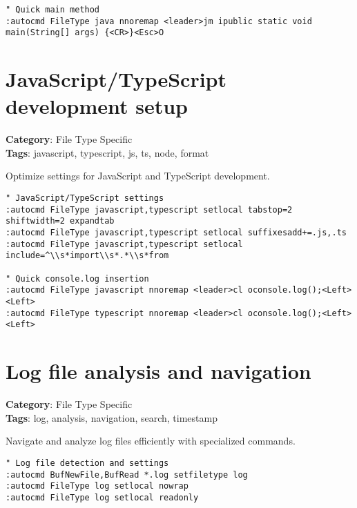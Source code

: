 {{{{{\begin{Exa*}{}
\begin{Verbatim}[fontsize=\footnotesize, breaklines, breakanywhere]
" Quick main method
:autocmd FileType java nnoremap <leader>jm ipublic static void main(String[] args) {<CR>}<Esc>O
\end{Verbatim}
\end{Exa*}

\section{JavaScript/TypeScript development setup}

\textbf{Category}: File Type Specific\\ \textbf{Tags}: javascript, typescript, js, ts, node, format
\vspace{0.5cm}

Optimize settings for JavaScript and TypeScript development.

\begin{Exa*}{}
\begin{Verbatim}[fontsize=\footnotesize, breaklines, breakanywhere]
" JavaScript/TypeScript settings
:autocmd FileType javascript,typescript setlocal tabstop=2 shiftwidth=2 expandtab
:autocmd FileType javascript,typescript setlocal suffixesadd+=.js,.ts
:autocmd FileType javascript,typescript setlocal include=^\\s*import\\s*.*\\s*from

" Quick console.log insertion
:autocmd FileType javascript nnoremap <leader>cl oconsole.log();<Left><Left>
:autocmd FileType typescript nnoremap <leader>cl oconsole.log();<Left><Left>
\end{Verbatim}
\end{Exa*}

\section{Log file analysis and navigation}

\textbf{Category}: File Type Specific\\ \textbf{Tags}: log, analysis, navigation, search, timestamp
\vspace{0.5cm}

Navigate and analyze log files efficiently with specialized commands.

\begin{Exa*}{}
\begin{Verbatim}[fontsize=\footnotesize, breaklines, breakanywhere]
" Log file detection and settings
:autocmd BufNewFile,BufRead *.log setfiletype log
:autocmd FileType log setlocal nowrap
:autocmd FileType log setlocal readonly


\end{Verbatim}
\end{Exa*}}}}}}
